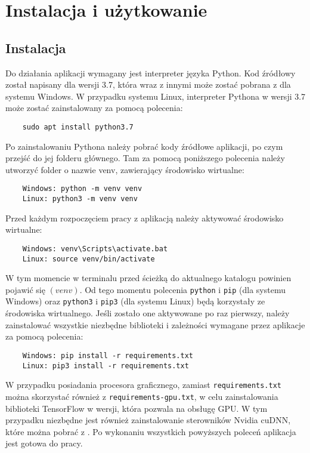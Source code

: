 \chapter{Instalacja i użytkowanie}
\thispagestyle{chapterBeginStyle}
\label{chapter6}


\section{Instalacja}
Do działania aplikacji wymagany jest interpreter języka Python. Kod źródłowy został napisany dla wersji 3.7, która wraz z innymi może zostać pobrana z \cite{PythonDownload} dla systemu Windows. W przypadku systemu Linux, interpreter Pythona w wersji 3.7 może zostać zainstalowany za pomocą polecenia:
\begin{verbatim}
    sudo apt install python3.7
\end{verbatim}

Po zainstalowaniu Pythona należy pobrać kody źródłowe aplikacji, po czym przejść do jej folderu głównego. Tam za pomocą poniższego polecenia należy utworzyć folder o nazwie venv, zawierający środowisko wirtualne:
\begin{verbatim}
    Windows: python -m venv venv
    Linux: python3 -m venv venv
\end{verbatim}
Przed każdym rozpoczęciem pracy z aplikacją należy aktywować środowisko wirtualne:
\begin{verbatim}
    Windows: venv\Scripts\activate.bat
    Linux: source venv/bin/activate
\end{verbatim}
W tym momencie w terminalu przed ścieżką do aktualnego katalogu powinien pojawić się $(venv)$. Od tego momentu polecenia \verb|python| i \verb|pip| (dla systemu Windows) oraz \verb|python3| i \verb|pip3| (dla systemu Linux) będą korzystały ze środowiska wirtualnego. Jeśli zostało one aktywowane po raz pierwszy, należy zainstalować wszystkie niezbędne biblioteki i zależności wymagane przez aplikacje za pomocą polecenia:
\begin{verbatim}
    Windows: pip install -r requirements.txt
    Linux: pip3 install -r requirements.txt
\end{verbatim}
W przypadku posiadania procesora graficznego, zamiast \verb|requirements.txt| można skorzystać również z \verb|requirements-gpu.txt|, w celu zainstalowania biblioteki TensorFlow w wersji, która pozwala na obsługę GPU. W tym przypadku niezbędne jest również zainstalowanie sterowników Nvidia cuDNN, które można pobrać z \cite{cuDNN}. Po wykonaniu wszystkich powyższych poleceń aplikacja jest gotowa do pracy.


